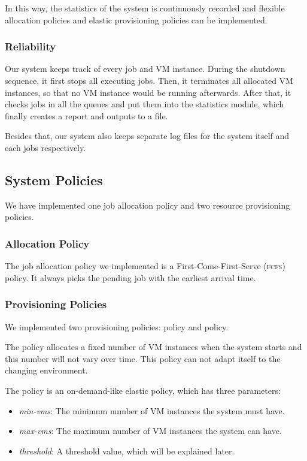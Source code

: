 In this way, the statistics of the system is continuously recorded
and flexible allocation policies and elastic provisioning policies can
be implemented.


\subsubsection{Reliability}
Our system keeps track of every job and VM instance. During the
shutdown sequence, it first stops all executing jobs. Then, it
terminates all allocated VM instances, so that no VM instance would be
running afterwards. After that, it checks jobs in all the queues and
put them into the statistics module, which finally creates a report
and outputs to a file.

Besides that, our system also keeps separate log files for the system
itself and each jobs respectively.


\subsection{System Policies}
We have implemented one job allocation policy and two resource
provisioning policies.

\subsubsection{Allocation Policy}
The job allocation policy we implemented is a First-Come-First-Serve
(\textsc{fcfs}) policy. It always picks the pending job with the
earliest arrival time.

\subsubsection{Provisioning Policies}
We implemented two provisioning policies: \policystatic{} policy and
\policysimpleelastic{} policy.

The \policystatic{} policy allocates a fixed number of VM instances when the
system starts and this number will not vary over time. This policy
can not adapt itself to the changing environment.

The \policysimpleelastic{} policy is an on-demand-like elastic policy, which has
three parameters:

\begin{itemize}
\item \emph{min-vms}: The minimum number of VM instances the system
  must have.
\item \emph{max-vms}: The maximum number of VM instances the system can
  have.
\item \emph{threshold}: A threshold value, which will be explained
  later.
\end{itemize}

